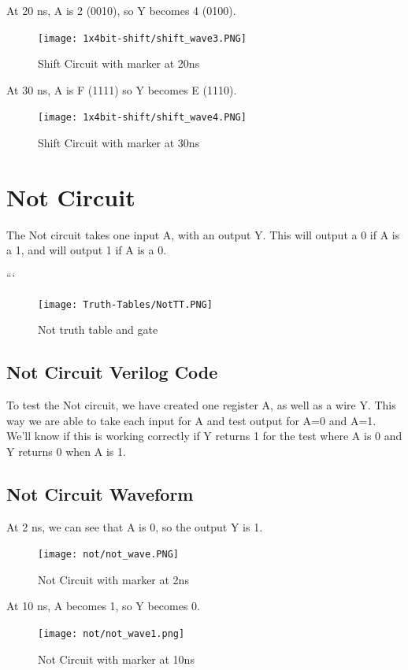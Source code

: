 \documentclass[12pt]{article}
\begin{document}
At 20 ns, A is 2 (0010), so Y becomes 4 (0100).
\begin{figure}[H]
    \centering
    \texttt{[image: 1x4bit-shift/shift\_wave3.PNG]}
    \caption{Shift Circuit with marker at 20ns}
    \label{fig:shift-wave3}
\end{figure}


At 30 ns, A is F (1111) so Y becomes E (1110).
\begin{figure}[H]
    \centering
    \texttt{[image: 1x4bit-shift/shift\_wave4.PNG]}
    \caption{Shift Circuit with marker at 30ns}
    \label{fig:shift-wave4}
\end{figure}

\section{Not Circuit}
The Not circuit takes one input A, with an output Y. This will output a 0 if A is a 1, and will output 1 if A is a 0.

```\begin{figure}[H]
    \centering
    \texttt{[image: Truth-Tables/NotTT.PNG]}
    \caption{Not truth table and gate}
    \label{fig:shift-table}
\end{figure}

\subsection{Not Circuit Verilog Code}


To test the Not circuit, we have created one register A, as well as a wire Y. This way we are able to take each input for A and test output for A=0 and A=1. We'll know if this is working correctly if Y returns 1 for the test where A is 0 and Y returns 0 when A is 1.


\subsection{Not Circuit Waveform}
At 2 ns, we can see that  A is 0, so the output Y is 1.
\begin{figure}[H]
    \centering
    \texttt{[image: not/not\_wave.PNG]}
    \caption{Not Circuit with marker at 2ns}
    \label{fig:enter-label}
\end{figure}

At 10 ns, A becomes 1, so Y becomes 0.
\begin{figure}[H]
    \centering
    \texttt{[image: not/not\_wave1.png]}
    \caption{Not Circuit with marker at 10ns}
    \label{fig:enter-label}
\end{figure}
\end{document}
